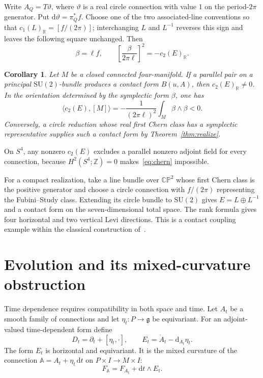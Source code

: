\documentclass[11pt,a4paper]{article}
\numberwithin{equation}{section}
\newtheorem{corollary}[theorem]{Corollary}
\theoremstyle{definition}
\theoremstyle{remark}
\newcommand{\g}{\mathfrak g}
\newcommand{\R}{\mathbb R}
\newcommand{\Z}{\mathbb Z}
\newcommand{\SU}{\mathrm{SU}}
\newcommand{\dd}{\mathrm d}
\begin{document}
Write $A_Q=T\vartheta$, where $\vartheta$ is a real circle connection
with value $1$ on the period-$2\pi$ generator. Put
$\dd\vartheta=\pi_Q^*f$. Choose one of the two associated-line conventions
so that $c_1(L)_{\R}=[f/(2\pi)]$; interchanging $L$ and $L^{-1}$
reverses this sign and leaves the following square unchanged. Then
\begin{equation}\label{eq:su2beta}
 \beta=\ell f,\qquad
 \left[\frac{\beta}{2\pi\ell}\right]^2=-c_2(E)_{\R}.
\end{equation}

\begin{corollary}\label{cor:su2}
Let $M$ be a closed connected four-manifold. If a parallel pair on a
principal $\SU(2)$-bundle produces a contact form $B(u,A)$, then
$c_2(E)_{\R}\ne0$. In the orientation determined by the symplectic form
$\beta$, one has
\begin{equation}\label{eq:chernnumber}
 \langle c_2(E),[M]\rangle
 =-\frac{1}{(2\pi\ell)^2}\int_M\beta\wedge\beta<0.
\end{equation}
Conversely, a circle reduction whose real first Chern class has a
symplectic representative supplies such a contact form by
Theorem~\ref{thm:realize}.
\end{corollary}

On $S^4$, any nonzero
$c_2(E)$ excludes a parallel nonzero adjoint field for every connection,
because $H^2(S^4;\Z)=0$ makes~\eqref{eq:chern} impossible.

For a compact realization, take a line bundle over $\mathbb{CP}^2$ whose
first Chern class is the positive generator and choose a circle connection
with $f/(2\pi)$ representing the Fubini--Study class. Extending its circle
bundle to $\SU(2)$ gives $E=L\oplus L^{-1}$ and a contact form on the
seven-dimensional total space. The rank formula gives four horizontal
and two vertical Levi directions. This is a contact coupling example
within the classical construction of~\cite{Lerman}.

\section{Evolution and its mixed-curvature obstruction}
\label{sec:dynamics}

Time dependence requires compatibility in both space and time. Let $A_t$ be
a smooth family of connections and let $\eta_t:P\to\g$ be equivariant.
For an adjoint-valued time-dependent form define
\[
 D_t=\partial_t+[\eta_t,\cdot],\qquad
 E_t=\dot A_t-\dd_{A_t}\eta_t.
\]
The form $E_t$ is horizontal and equivariant. It is the mixed curvature of
the connection $\mathbb A=A_t+\eta_t\,\dd t$ on $P\times I\to M\times I$:
\begin{equation}\label{eq:spacetime}
 F_{\mathbb A}=F_{A_t}+\dd t\wedge E_t.
\end{equation}
\end{document}
